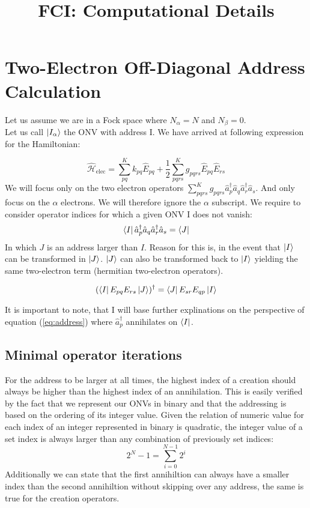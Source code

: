 \documentclass[12p]{article}
\title{FCI: Computational Details}
\author{}
\begin{document}
\maketitle

\section{Two-Electron Off-Diagonal Address Calculation}

Let us assume we are in a Fock space where $N_{\alpha} = N$ and $N_{\beta} = 0$.
\\
Let us call $\ket{I_{\alpha}}$ the ONV with address I.
We have arrived at following expression for the Hamiltonian:

      \begin{equation}\label{eq:ham}
          \hat{\mathcal{H}}_\text{elec} = \sum_{pq}^K k_{pq} \hat{E}_{pq} + \frac{1}{2} \sum_{pqrs}^K g_{pqrs} \hat{E}_{pq} \hat{E}_{rs}
      \end{equation}
We will focus only on the two electron operators $ \sum_{pqrs}^K g_{pqrs} \hat{a}^{\dagger}_{p} \hat{a}_{q}  \hat{a}^{\dagger}_{r} \hat{a}_{s}$. And only focus on the $\alpha$ electrons. We will therefore ignore the $\alpha$ subscript.
We require to consider operator indices for which a given ONV I does not vanish:
\begin{equation}
  \bra{I} \hat{a}^{\dagger}_{p} \hat{a}_{q} \hat{a}^{\dagger}_{r} \hat{a}_{s} = \bra{J}
\end{equation}
In which $J$ is an address larger than $I$. Reason for this is, in the event that $\ket{I}$ can be transformed in $\ket{J}$. $\ket{J}$ can also be transformed back to $\ket{I}$ yielding the same two-electron term (hermitian two-electron operators).

\begin{equation}
  (\bra{I} E_{pq} E_{rs} \ket{J})^\dagger = \bra{J} E_{sr} E_{qp} \ket{I}
\end{equation}

It is important to note, that I will base further explinations on the perspective of equation (\ref{eq:address}) where $\hat{a}^{\dagger}_{p}$ annihilates on $\bra{I}$.

\subsection{Minimal operator iterations}
For the address to be larger at all times, the highest index of a creation should always be higher than the highest index of an annihilation. This is easily verified by the fact that we represent our ONVs in binary and that the addressing is based on the ordering of its integer value. Given the relation of numeric value for each index of an integer represented in binary is quadratic, the integer value of a set index is always larger than any combination of previously set indices:
\begin{equation}
  2^N - 1 = \sum^{N-1}_{i=0} 2^i
\end{equation}
Additionally we can state that the first annihiltion can always have a smaller index than the second annihiltion without skipping over any address, the same is true for the creation operators.
\end{document}
